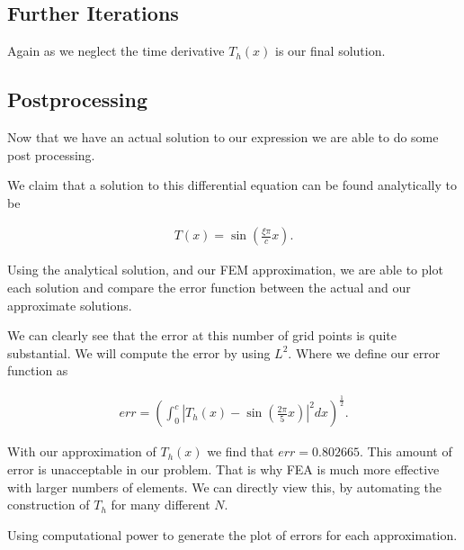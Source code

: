 \documentclass[10pt]{amsart}
\numberwithin{equation}{section}
\newenvironment{Figure}
{\par\medskip\noindent\minipage{\linewidth}}
{\endminipage\par\medskip}
\theoremstyle{definition}
\begin{document}
\begin{multicols}{2}
\subsection{Further Iterations}%
\label{sub:further_iterations}

Again as we neglect the time derivative $T_h(x)$ is our final solution.

\subsection{Postprocessing}%
\label{sub:postprocessing}

Now that we have an actual solution to our expression we are able to do some
post processing.

We claim that a solution to this differential equation can be found analytically
to be

\begin{align*}
  T(x) = \sin\left(\frac{\xi\pi}{c}x\right).
\end{align*}

Using the analytical solution, and our FEM approximation, we are able to plot
each solution and compare the error function between the actual and our
approximate solutions.

\begin{Figure}
   \begin{center}
     
   \end{center}
\end{Figure}

We can clearly see that the error at this number of grid points is quite
substantial. We will compute the error by using $L^2$. Where we define our
error function as

\begin{align*}
  err =
  {\left(\int_0^c{\left|T_h(x)-\sin\left(\frac{2\pi}{5}x\right)\right|}^2dx\right)}^{\frac{1}{2}}.
\end{align*}

With our approximation of $T_h(x)$ we find that $err=0.802665$. This amount of
error is unacceptable in our problem. That is why FEA is much more effective
with larger numbers of elements. We can directly view this, by automating the
construction of $T_h$ for many different $N$.

Using computational power to generate the plot of errors for each
approximation.

\begin{Figure}
   \begin{center}
     
   \end{center}
\end{Figure}


\end{multicols}
\end{document}
